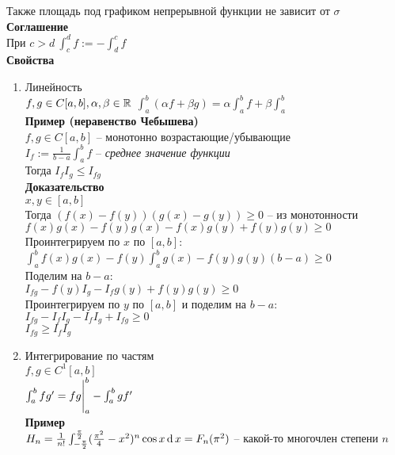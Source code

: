 \documentclass[12pt]{article}
\begin{document}
Также площадь под графиком непрерывной функции не зависит от $\sigma$\\
\textbf{Соглашение}\\
При $c > d\ \int_c^d f := - \int_d^c f$\\
\textbf{Свойства}
\begin{enumerate}
    \item Линейность\\
    $f, g \in C[a,b], \alpha, \beta \in \mathbb{R}$
    $\int_a^b (\alpha f + \beta g) = \alpha \int_a^b f + \beta \int_a^b$\\
    \textbf{Пример (неравенство Чебышева)}\\
    $f, g \in C[a,b]$ -- монотонно возрастающие/убывающие\\
    $I_f := \frac1{b-a}\int_a^b f$ -- \textit{среднее значение функции}\\
    Тогда $I_f I_g \leq I_{fg}$\\
    \textbf{Доказательство}\\
    $x,y \in [a,b]$\\
    Тогда $(f(x)-f(y))(g(x)-g(y)) \geq 0$ -- из монотонности\\
    $f(x)g(x) - f(y)g(x)-f(x)g(y)+f(y)g(y) \geq 0$\\
    Проинтегрируем по $x$ по $[a,b]$:\\
    $\int_a^b f(x)g(x) - f(y)\int_a^b g(x) - f(y)g(y)(b-a) \geq 0$\\
    Поделим на $b-a$:\\
    $I_{fg} - f(y)I_g - I_f g(y) + f(y)g(y) \geq 0$\\
    Проинтегрируем по $y$ по $[a,b]$ и поделим на $b-a$:\\
    $I_{fg} - I_fI_g-I_fI_g + I_{fg} \geq 0$\\
    $I_{fg} \geq I_fI_g$
    \item Интегрирование по частям\\
    $f, g \in C^1[a,b]$\\
    $\int_a^b fg' = fg\Biggr|_a^b - \int_a^b gf'$\\
    \textbf{Пример}\\
    $H_n = \frac{1}{n!}\int_{-\frac\pi2}^{\frac\pi2}(\frac{\pi^2}4 - x^2)^n\cos x \operatorname{d} x = F_n(\pi^2)$ -- какой-то многочлен степени $n$\\

\end{enumerate}
\end{document}
